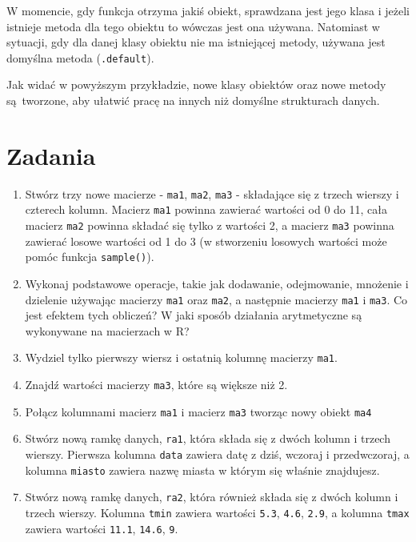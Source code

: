 \documentclass[paper=6in:9in,pagesize=pdftex,headinclude=on,footinclude=on,10pt]{scrbook}
\providecommand{\tightlist}{%
  \setlength{\itemsep}{0pt}\setlength{\parskip}{0pt}}
\begin{document}
W momencie, gdy funkcja otrzyma jakiś obiekt, sprawdzana jest jego klasa i jeżeli istnieje metoda dla tego obiektu to wówczas jest ona używana.
Natomiast w sytuacji, gdy dla danej klasy obiektu nie ma istniejącej metody, używana jest domyślna metoda (\texttt{.default}).

Jak widać w powyższym przykładzie, nowe klasy obiektów oraz nowe metody są~tworzone, aby ułatwić pracę na innych niż domyślne strukturach danych.

\hypertarget{zadania-6}{%
\section{Zadania}\label{zadania-6}}

\begin{enumerate}
\def\labelenumi{\arabic{enumi})}
\tightlist
\item
  Stwórz trzy nowe macierze - \texttt{ma1}, \texttt{ma2}, \texttt{ma3} - składające się z trzech wierszy i czterech kolumn.
  Macierz \texttt{ma1} powinna zawierać wartości od 0 do 11, cała macierz \texttt{ma2} powinna składać się tylko z wartości 2, a macierz \texttt{ma3} powinna zawierać losowe wartości od 1 do 3 (w stworzeniu losowych wartości może pomóc funkcja \texttt{sample()}).
\item
  Wykonaj podstawowe operacje, takie jak dodawanie, odejmowanie, mnożenie i dzielenie używając macierzy \texttt{ma1} oraz \texttt{ma2}, a następnie macierzy \texttt{ma1} i \texttt{ma3}.
  Co jest efektem tych obliczeń?
  W jaki sposób działania arytmetyczne są wykonywane na macierzach w R?
\item
  Wydziel tylko pierwszy wiersz i ostatnią kolumnę macierzy \texttt{ma1}.
\item
  Znajdź wartości macierzy \texttt{ma3}, które są większe niż 2.
\item
  Połącz kolumnami macierz \texttt{ma1} i macierz \texttt{ma3} tworząc nowy obiekt \texttt{ma4}
\item
  Stwórz nową ramkę danych, \texttt{ra1}, która składa się z dwóch kolumn i trzech wierszy.
  Pierwsza kolumna \texttt{data} zawiera datę z dziś, wczoraj i przedwczoraj, a kolumna \texttt{miasto} zawiera nazwę miasta w którym się właśnie znajdujesz.
\item
  Stwórz nową ramkę danych, \texttt{ra2}, która również składa się z dwóch kolumn i trzech wierszy.
  Kolumna \texttt{tmin} zawiera wartości \texttt{5.3}, \texttt{4.6}, \texttt{2.9}, a kolumna \texttt{tmax} zawiera wartości \texttt{11.1}, \texttt{14.6}, \texttt{9}.

\end{enumerate}
\end{document}

